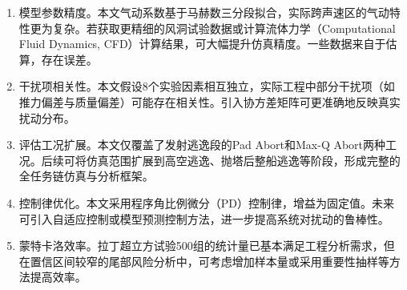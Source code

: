 \begin{enumerate}
    \item 模型参数精度。本文气动系数基于马赫数三分段拟合，实际跨声速区的气动特性更为复杂。若获取更精细的风洞试验数据或计算流体力学（Computational Fluid Dynamics, CFD）计算结果，可大幅提升仿真精度。一些数据来自于估算，存在误差。

    \item 干扰项相关性。本文假设8个实验因素相互独立，实际工程中部分干扰项（如推力偏差与质量偏差）可能存在相关性。引入协方差矩阵可更准确地反映真实扰动分布。

    \item 评估工况扩展。本文仅覆盖了发射逃逸段的Pad Abort和Max-Q Abort两种工况。后续可将仿真范围扩展到高空逃逸、抛塔后整船逃逸等阶段，形成完整的全任务链仿真与分析框架。

    \item 控制律优化。本文采用程序角比例微分（PD）控制律，增益为固定值。未来可引入自适应控制或模型预测控制方法，进一步提高系统对扰动的鲁棒性。

    \item 蒙特卡洛效率。拉丁超立方试验500组的统计量已基本满足工程分析需求，但在置信区间较窄的尾部风险分析中，可考虑增加样本量或采用重要性抽样等方法提高效率。
\end{enumerate}
